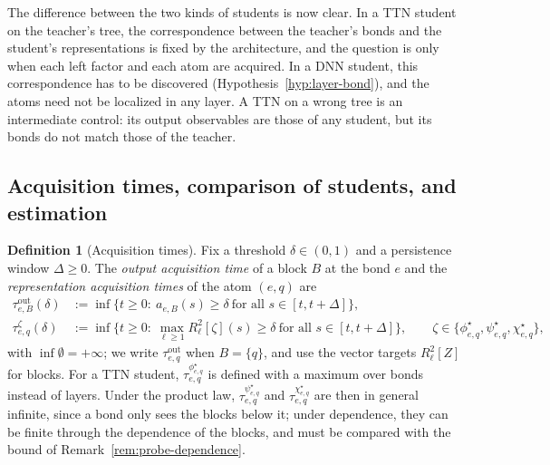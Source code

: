 \documentclass[11pt]{article}
\theoremstyle{definition}
\newtheorem{definition}[theorem]{Definition}
\numberwithin{equation}{section}
\begin{document}
The difference between the two kinds of students is now clear. In a TTN student on the teacher's tree, the correspondence between the teacher's bonds and the student's representations is fixed by the architecture, and the question is only when each left factor and each atom are acquired. In a DNN student, this correspondence has to be discovered (Hypothesis~\ref{hyp:layer-bond}), and the atoms need not be localized in any layer. A TTN on a wrong tree is an intermediate control: its output observables are those of any student, but its bonds do not match those of the teacher.

\subsection{Acquisition times, comparison of students, and estimation}\label{sec:compare-protocol}

\begin{definition}[Acquisition times]\label{def:acq-times}
Fix a threshold $\delta\in(0,1)$ and a persistence window $\Delta\ge0$. The \emph{output acquisition time} of a block $B$ at the bond $e$ and the \emph{representation acquisition times} of the atom $(e,q)$ are
\begin{align*}
\tau^{\mathrm{out}}_{e,B}(\delta)&:=\inf\big\{t\ge0:\ a_{e,B}(s)\ge\delta\ \text{for all }s\in[t,t+\Delta]\big\},\\
\tau^{\zeta}_{e,q}(\delta)&:=\inf\Big\{t\ge0:\ \max_{\ell\ge1}R^2_\ell[\zeta](s)\ge\delta\ \text{for all }s\in[t,t+\Delta]\Big\},\qquad\zeta\in\{\phi^\star_{e,q},\psi^\star_{e,q},\chi^\star_{e,q}\},
\end{align*}
with $\inf\emptyset=+\infty$; we write $\tau^{\mathrm{out}}_{e,q}$ when $B=\{q\}$, and use the vector targets $R^2_\ell[Z]$ for blocks. For a TTN student, $\tau^{\phi^\star_{e,q}}_{e,q}$ is defined with a maximum over bonds instead of layers. Under the product law, $\tau^{\psi^\star_{e,q}}_{e,q}$ and $\tau^{\chi^\star_{e,q}}_{e,q}$ are then in general infinite, since a bond only sees the blocks below it; under dependence, they can be finite through the dependence of the blocks, and must be compared with the bound of Remark~\ref{rem:probe-dependence}.
\end{definition}
\end{document}
